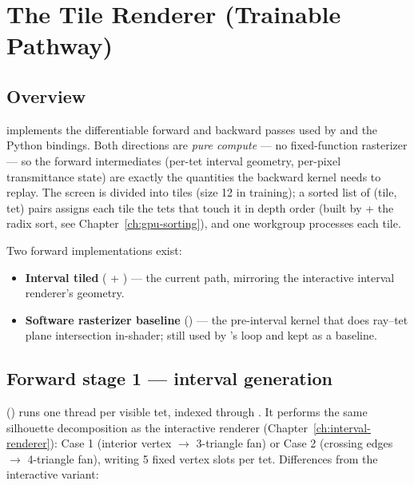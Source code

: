 \chapter{The Tile Renderer (Trainable Pathway)}\label{ch:tile-renderer}

\section{Overview}

 implements the differentiable forward and backward
passes used by  and the Python bindings. Both directions
are \emph{pure compute} --- no fixed-function rasterizer --- so the forward
intermediates (per-tet interval geometry, per-pixel transmittance state) are
exactly the quantities the backward kernel needs to replay. The screen is
divided into tiles (size 12 in training); a sorted list of
(tile, tet) pairs assigns each tile the tets that touch it in depth order
(built by  + the radix sort, see Chapter~\ref{ch:gpu-sorting}),
and one workgroup processes each tile.

Two forward implementations exist:
\begin{itemize}
\item \textbf{Interval tiled} ( +
  ) --- the current path, mirroring the
  interactive interval renderer's geometry.
\item \textbf{Software rasterizer baseline} ()
  --- the pre-interval kernel that does ray--tet plane intersection
  in-shader; still used by 's loop and kept as a baseline.
\end{itemize}

\section{Forward stage 1 --- interval generation}

 () runs one
thread per visible tet, indexed through . It performs
the same silhouette decomposition as the interactive renderer
(Chapter~\ref{ch:interval-renderer}): Case 1 (interior vertex $\to$ 3-triangle
fan) or Case 2 (crossing edges $\to$ 4-triangle fan), writing 5 fixed vertex
slots per tet. Differences from the interactive variant:

